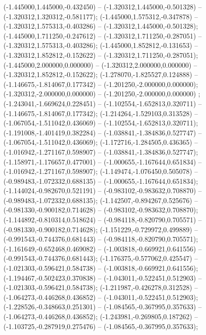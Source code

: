 (-1.445000,1.445000,-0.432450) -- (-1.320312,1.445000,-0.501328) -- (-1.320312,1.320312,-0.581177);
 (-1.445000,1.575312,-0.347878) -- (-1.320312,1.575313,-0.403286) -- (-1.320312,1.445000,-0.501328);
 (-1.445000,1.711250,-0.247612) -- (-1.320312,1.711250,-0.287051) -- (-1.320312,1.575313,-0.403286);
 (-1.445000,1.852812,-0.131653) -- (-1.320312,1.852812,-0.152622) -- (-1.320312,1.711250,-0.287051);
 (-1.445000,2.000000,0.000000) -- (-1.320312,2.000000,0.000000) -- (-1.320312,1.852812,-0.152622);
 (-1.278070,-1.825527,0.124888) -- (-1.146675,-1.814067,0.177342) -- (-1.201250,-2.000000,0.000000);
 (-1.320312,-2.000000,0.000000) -- (-1.201250,-2.000000,0.000000) ;
 (-1.243041,-1.669624,0.228451) -- (-1.102554,-1.652813,0.320711) -- (-1.146675,-1.814067,0.177342);
 (-1.214264,-1.529103,0.313528) -- (-1.067054,-1.511042,0.436069) -- (-1.102554,-1.652813,0.320711);
 (-1.191008,-1.401419,0.382284) -- (-1.038841,-1.384836,0.527747) -- (-1.067054,-1.511042,0.436069);
 (-1.172716,-1.284505,0.436365) -- (-1.016942,-1.271167,0.598907) -- (-1.038841,-1.384836,0.527747);
 (-1.158971,-1.176657,0.477001) -- (-1.000655,-1.167644,0.651834) -- (-1.016942,-1.271167,0.598907);
 (-1.149474,-1.076450,0.505078) -- (-0.989483,-1.072332,0.688135) -- (-1.000655,-1.167644,0.651834);
 (-1.144024,-0.982670,0.521191) -- (-0.983102,-0.983632,0.708870) -- (-0.989483,-1.072332,0.688135);
 (-1.142507,-0.894267,0.525676) -- (-0.981330,-0.900182,0.714628) -- (-0.983102,-0.983632,0.708870);
 (-1.144892,-0.810314,0.518624) -- (-0.984118,-0.820790,0.705571) -- (-0.981330,-0.900182,0.714628);
 (-1.151229,-0.729972,0.499889) -- (-0.991543,-0.744376,0.681443) -- (-0.984118,-0.820790,0.705571);
 (-1.161649,-0.652468,0.469082) -- (-1.003818,-0.669921,0.641556) -- (-0.991543,-0.744376,0.681443);
 (-1.176375,-0.577062,0.425547) -- (-1.021303,-0.596421,0.584738) -- (-1.003818,-0.669921,0.641556);
 (-1.194467,-0.502423,0.370838) -- (-1.043011,-0.522451,0.512903) -- (-1.021303,-0.596421,0.584738);
 (-1.211987,-0.426278,0.312528) -- (-1.064273,-0.446268,0.436852) -- (-1.043011,-0.522451,0.512903);
 (-1.228526,-0.348663,0.251301) -- (-1.084565,-0.367995,0.357633) -- (-1.064273,-0.446268,0.436852);
 (-1.243981,-0.269805,0.187262) -- (-1.103725,-0.287919,0.275476) -- (-1.084565,-0.367995,0.357633);
